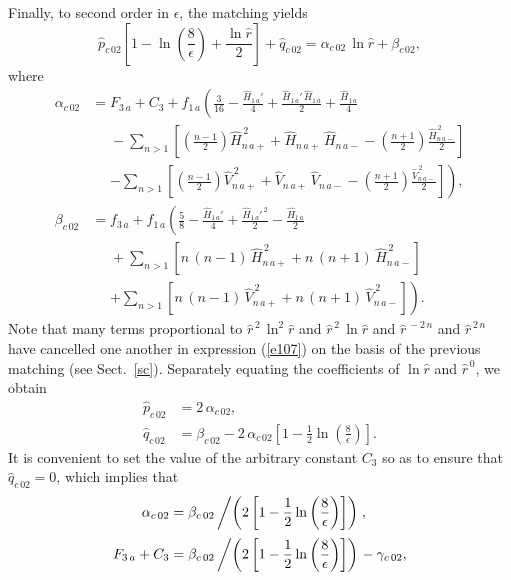 \documentclass[12pt,prb,aps]{revtex4-1}
\begin{document}
Finally, to second order in $\epsilon$, the matching yields 
\begin{equation}\label{e107}
\hat{p}_{c\,02}\left[1-\ln\left(\frac{8}{\epsilon}\right)+\frac{\ln\hat{r}}{2}\right]+\hat{q}_{c\,02} = \alpha_{c\,02}\,\ln\hat{r}+ \beta_{c\,02},
\end{equation}
where
\begin{align}
\alpha_{c\,02}&= F_{3\,a}+C_3+f_{1\,a}\left(\frac{3}{16} -\frac{\hat{H}_{1\,a}'}{4}+\frac{\hat{H}_{1\,a}'\,\hat{H}_{1\,a}}{2}+\frac{\hat{H}_{1\,a}}{4}\right.\nonumber\\[0.5ex]
&\phantom{=}-\sum_{n>1}\left[\left(\frac{n-1}{2}\right)\hat{H}_{n\,a+}^{\,2} +\hat{H}_{n\,a+}\,\hat{H}_{n\,a-}-\left(\frac{n+1}{2}\right)\frac{\hat{H}_{n\,a-}^{\,2}}{2}\right]
\nonumber\\[0.5ex]
&\phantom{=}\left.-\sum_{n>1}\left[\left(\frac{n-1}{2}\right)\hat{V}_{n\,a+}^{\,2} + \hat{V}_{n\,a+}\,\hat{V}_{n\,a-}-\left(\frac{n+1}{2}\right)\frac{\hat{V}_{n\,a-}^{\,2}}{2}\right]
\right),\\[0.5ex]
\beta_{c\,02}&= f_{3\,a}+f_{1\,a}\left(\frac{5}{8} -\frac{\hat{H}_{1\,a}'}{4}+\frac{\hat{H}_{1\,a}'^{\,2}}{2}-\frac{\hat{H}_{1\,a}}{2}\right.\nonumber\\[0.5ex]
&\phantom{=}+\sum_{n>1}\left[n\,(n-1)\,\hat{H}_{n\,a+}^{\,2} +n\,(n+1)\,\hat{H}_{n\,a-}^{\,2}\right]
\nonumber\\[0.5ex]
&\phantom{=}\left.+\sum_{n>1}\left[n\,(n-1)\,\hat{V}_{n\,a+}^{\,2} +n\,(n+1)\,\hat{V}_{n\,a-}^{\,2}\right]
\right).\label{e112e}
\end{align}
Note that many terms proportional to $\hat{r}^{\,2}\,\ln^2\hat{r}$ and $\hat{r}^{\,2}\,\ln\hat{r}$ and $\hat{r}^{\,-2\,n}$ and $\hat{r}^{\,2\,n}$ have cancelled 
one another  in  expression (\ref{e107}) on the basis of the previous matching (see Sect.~\ref{sc}). 
Separately equating the coefficients of $\ln\hat{r}$ and $\hat{r}^{\,0}$, we obtain
\begin{align}
\hat{p}_{c\,02} &= 2\,\alpha_{c\,02},\\[0.5ex]
\hat{q}_{c\,02} &=\beta_{c\,02}-2\,\alpha_{c\,02} \left[1-\frac{1}{2}\ln\left(\frac{8}{\epsilon}\right)\right].
\end{align}
It is convenient to set the value of the arbitrary constant $C_3$ so as to ensure that $\hat{q}_{c\,02}=0$,
which implies that
\begin{align}
\alpha_{c\,02} &= \beta_{c\,02}\left/\left(2\left[1-\frac{1}{2}\ln\left(\frac{8}{\epsilon}\right)\right]\right)\right.,\\[0.5ex]
F_{3\,a}+C_3 &= \beta_{c\,02}\left/\left(2\left[1-\frac{1}{2}\ln\left(\frac{8}{\epsilon}\right)\right]\right)\right.-\gamma_{c\,02},
\end{align}
\end{document}
